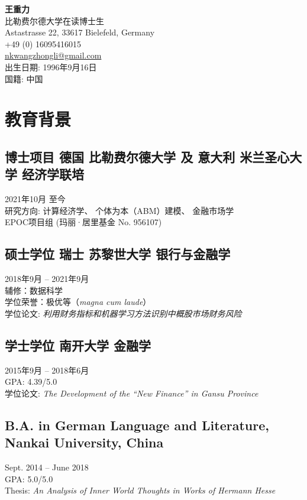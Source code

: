 \documentclass[11pt,a4paper]{article}
\begin{document}
\begin{flushright}
\textbf{王重力} \\
比勒费尔德大学在读博士生 \\
Astastrasse 22, 33617 Bielefeld, Germany \\
+49 (0) 16095416015 \\
\href{mailto:nkwangzhongli@gmail.com}{nkwangzhongli@gmail.com} \\
出生日期: 1996年9月16日 \\
国籍: 中国 \\
\end{flushright}

\section*{教育背景}
\subsection*{博士项目\;\; 德国\; 比勒费尔德大学\; 及\; 意大利\; 米兰圣心大学\; 经济学联培}
2021年10月\; 至今 \\
研究方向: 计算经济学、 个体为本（ABM）建模、 金融市场学 \\
EPOC项目组 (玛丽·居里基金 No. 956107)

\subsection*{硕士学位\;\; 瑞士\; 苏黎世大学\; 银行与金融学}
2018年9月 -- 2021年9月 \\
辅修：数据科学 \\
学位荣誉：极优等（\textit{magna cum laude}）  \\
学位论文: \textit{利用财务指标和机器学习方法识别中概股市场财务风险}

\subsection*{学士学位\; 南开大学\; 金融学}
2015年9月 -- 2018年6月 \\
GPA: 4.39/5.0 \\
学位论文: \textit{The Development of the ``New Finance'' in Gansu Province}

\subsection*{B.A. in German Language and Literature, Nankai University, China}
Sept. 2014 -- June 2018 \\
GPA: 5.0/5.0 \\
Thesis: \textit{An Analysis of Inner World Thoughts in Works of Hermann Hesse}
\end{document}
